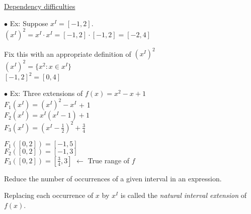 \documentclass{slides}
\begin{document}
\begin{slide}
\begin{center}
\underline{Dependency difficulties}
\end{center}
$\bullet$ Ex:  Suppose $x^I = [-1,2]$. \\
$(x^I)^2 = x^I \cdot x^I = [-1,2] \cdot [-1,2] = [-2,4]$ 

Fix this with an appropriate definition of $(x^I)^2$ \\
$(x^I)^2 = \{ x^2 : x \in x^I \}$ \\
$[-1,2]^2 = [0,4]$ 

$\bullet$ Ex:  Three extensions of $f(x) = x^2 - x + 1$ \\
$F_1 (x^I) = (x^I)^2 - x^I$ + 1\\
$F_2(x^I) = x^I(x^I-1) + 1$ \\
$F_3 (x^I) = (x^I-\frac{1}{2})^2 + \frac{3}{4}$ 

$F_1([0,2]) = [-1,5]$ \\
$F_2([0,2]) = [-1,3]$ \\
$F_3([0,2]) = [\frac{3}{4},3]$   $\leftarrow$ True range of $f$

Reduce the number of occurrences of a given interval in an expression.

Replacing each occurrence of $x$ by $x^I$ is called the {\it natural
interval extension} of $f(x)$.\\

\end{slide}
\end{document}
